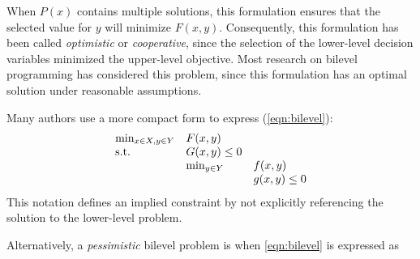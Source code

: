 When $P(x)$ contains multiple solutions, this formulation ensures
that the selected value for $y$ will minimize $F(x,y)$.  Consequently,
this formulation has been called \textit{optimistic} or
\textit{cooperative}, since the selection of the lower-level decision
variables minimized the upper-level objective.  Most research on
bilevel programming has considered this problem, since this formulation
has an optimal solution under reasonable assumptions.

Many authors use a more compact form to express (\ref{eqn:bilevel}):
\begin{equation}
\label{eqn:bilevel-compact}
\begin{array}{lll}
\min_{x \in X, y \in Y}   & F(x,y) & \\
\textrm{s.t.}                       & G(x,y) \leq 0 & \\
                          & \min_{y \in Y}    & f(x,y)\\
                          &                   & g(x,y) \leq 0
\end{array}
\end{equation}
This notation defines an implied constraint by not explicitly referencing the solution to the lower-level problem.

Alternatively, a \textit{pessimistic} bilevel problem is when \eqref{eqn:bilevel} is expressed as 

